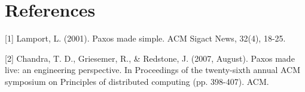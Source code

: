 \documentclass[11pt]{article}
\begin{document}
\section{References}

[1] Lamport, L. (2001). Paxos made simple. ACM Sigact News, 32(4), 18-25.

[2] Chandra, T. D., Griesemer, R., \& Redstone, J. (2007, August). Paxos made live: an engineering perspective. In Proceedings of the twenty-sixth annual ACM symposium on Principles of distributed computing (pp. 398-407). ACM.
\end{document}

